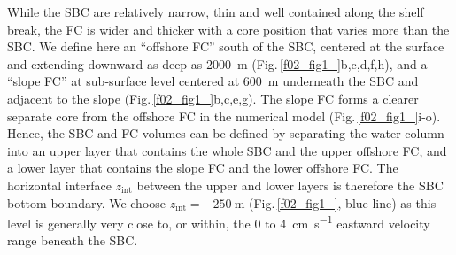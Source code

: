 \documentclass[preprint,3p,review,12pt]{elsarticle}
\newcommand{\sub}[1]{_{\text{#1}}}
\begin{document}
While the SBC are relatively narrow, thin and well contained along the shelf break, the FC is wider and thicker with a core position that varies more than the SBC\@. We define here an \enquote{offshore FC}
south of the SBC, centered at the surface and extending downward as deep as \SI{2000}{\meter} (Fig.\,\ref{f02_fig1_}b,c,d,f,h), and
a \enquote{slope FC} at sub-surface level centered at \SI{600}{\meter} underneath the SBC and adjacent to the slope (Fig.\,\ref{f02_fig1_}b,c,e,g). The slope FC forms a clearer separate core from the offshore FC in the numerical model (Fig.\,\ref{f02_fig1_}i-o).
Hence, the SBC and FC volumes can be defined by separating the water column into an upper layer that contains the whole SBC and the upper offshore FC, and a lower layer that contains the slope FC and the lower offshore FC\@. The horizontal interface $z\sub{int}$ between the upper and lower layers is therefore the SBC bottom boundary. We choose $z\sub{int} = \SI{-250}{\meter}$ (Fig.\,\ref{f02_fig1_}, blue line) as this level is generally very close to, or within, the \num{0} to \SI{4}{\centi\meter\per\second} eastward velocity range beneath the SBC.
%
\end{document}
